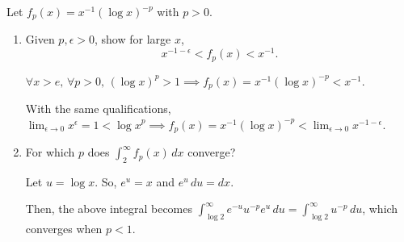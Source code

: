 \documentclass[../hw1]{subfiles}
\begin{document}
\begin{problem}[4]
Let $f_p(x)=x^{-1}{(\log{x})}^{-p}$ with $p>0$.
\begin{enumerate}[label=\alph*)]
	\item Given $p,\epsilon>0$, show for large $x$, \[
		      x^{-1-\epsilon}<f_p(x)<x^{-1}
		      .\]

	      $\forall x>e,\, \forall p>0,\, {(\log{x} )}^p>1 \implies f_p(x)=x^{-1}{(\log{x} )}^{-p} < x^{-1}$.

	      With the same qualifications, $\lim_{\epsilon \to 0} x^{\epsilon} = 1 < {\log{x}}^p \implies f_p(x)=x^{-1}{(\log{x} )}^{-p}<\lim_{\epsilon \to 0} x^{-1-\epsilon}$.

	\item For which $p$ does  $\int_{2}^{\infty} f_p(x) \,dx$ converge?

	      Let $u=\log{x}$. So, $e^u = x$ and  $e^u\,du = dx$.

	      Then, the above integral becomes  $\int_{\log{2}}^{\infty} e^{-u}u^{-p} e^u\,du = \int_{\log{2} }^{\infty} u^{-p} \,du$,
	      which converges when $p<1$.
\end{enumerate}
\end{problem}
\end{document}
